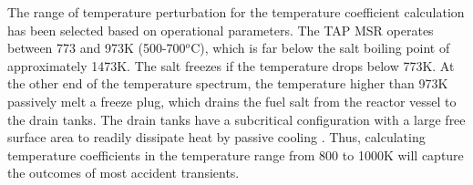 The range of temperature perturbation for the temperature coefficient  
calculation has been selected based on operational parameters. The \gls{TAP} 
\gls{MSR} operates between 773 and 973K (500-700$^o$C), which is far below the 
salt boiling point of approximately 1473K. The salt freezes if the temperature 
drops below 773K. At the other end of the temperature spectrum, the 
temperature higher than 973K passively melt a freeze plug, which drains the 
fuel salt from the reactor vessel to the drain tanks. The drain tanks have a 
subcritical configuration with a large free surface area to readily dissipate 
heat by passive cooling \cite{transatomic_power_corporation_technical_2016}. 
Thus, calculating temperature coefficients in the temperature range from 800 
to 1000K will capture  the outcomes of most
accident transients.

